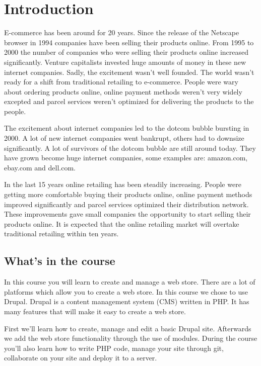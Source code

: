 \chapter{Introduction}

E-commerce has been around for 20 years. Since the release of the Netscape browser in 1994 companies have been selling their products online. From 1995 to 2000 the number of companies who were selling their products online increased significantly. Venture capitalists invested huge amounts of money in these new internet companies. Sadly, the excitement wasn't well founded. The world wasn't ready for a shift from traditional retailing to e-commerce. People were wary about ordering products online, online payment methods weren't very widely excepted and parcel services weren't optimized for delivering the products to the people.

The excitement about internet companies led to the dotcom bubble bursting in 2000. A lot of new internet companies went bankrupt, others had to downsize significantly. A lot of survivors of the dotcom bubble are still around today. They have grown become huge internet companies, some examples are: amazon.com, ebay.com and dell.com.

In the last 15 years online retailing has been steadily increasing. People were getting more comfortable buying their products online, online payment methods improved significantly and parcel services optimized their distribution network. These improvements gave small companies the opportunity to start selling their products online. It is expected that the online retailing market will overtake traditional retailing within ten years. 

\section{What's in the course}

In this course you will learn to create and manage a web store. There are a lot of platforms which allow you to create a web store. In this course we chose to use Drupal. Drupal is a content management system (CMS) written in PHP. It has many features that will make it easy to create a web store. 

First we'll learn how to create, manage and edit a basic Drupal site. Afterwards we add the web store functionality through the use of modules. During the course you'll also learn how to write PHP code, manage your site through git, collaborate on your site and deploy it to a server.

